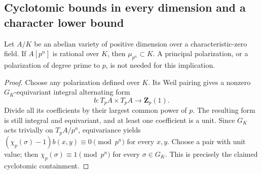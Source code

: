 \subsection{Cyclotomic bounds in every dimension and a character lower bound}

\begin{lemma}
\label{lem:B-RD14}
Let $A/K$ be an abelian variety of positive dimension over a
characteristic-zero field. If $A[p^n]$ is rational over $K$, then
$\mu_{p^n}\subset K$. A principal polarization, or a polarization of
degree prime to $p$, is not needed for this implication.
\end{lemma}
\begin{proof}
Choose any polarization defined over $K$. Its Weil pairing gives a
nonzero $G_K$-equivariant integral alternating form
\[
 b:T_pA\times T_pA\longrightarrow\mathbf Z_p(1).
\]
Divide all its coefficients by their largest common power of $p$.
The resulting form is still integral and equivariant, and at least
one coefficient is a unit. Since $G_K$ acts trivially on $T_pA/p^n$,
equivariance yields
$(\chi_p(\sigma)-1)b(x,y)\equiv0\pmod {p^n}$ for every $x,y$.
Choose a pair with unit value; then
$\chi_p(\sigma)\equiv1\pmod {p^n}$ for every $\sigma\in G_K$.
This is precisely the claimed cyclotomic containment.
\end{proof}

